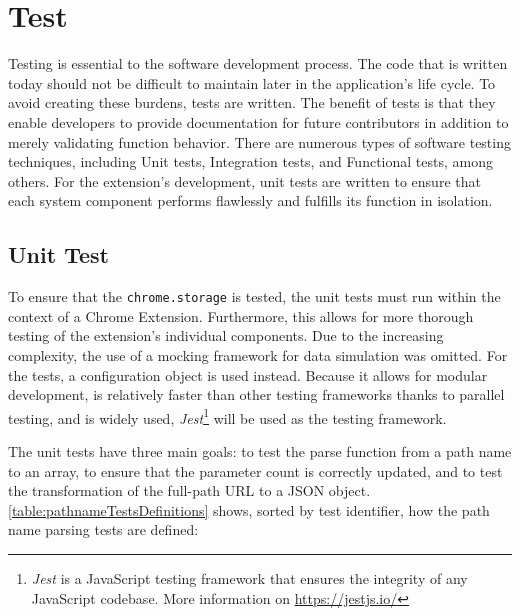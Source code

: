 \chapter{Test}
Testing is essential to the software development process. The code that is written today should not be difficult to maintain later in the application's life cycle. To avoid creating these burdens, tests are written. The benefit of tests is that they enable developers to provide documentation for future contributors in addition to merely validating function behavior. There are numerous types of software testing techniques, including Unit tests, Integration tests, and Functional tests, among others. For the extension's development, unit tests are written to ensure that each system component performs flawlessly and fulfills its function in isolation.

\section{Unit Test}
To ensure that the \texttt{chrome.storage} is tested, the unit tests must run within the context of a Chrome Extension. Furthermore, this allows for more thorough testing of the extension's individual components. Due to the increasing complexity, the use of a mocking framework for data simulation was omitted. For the tests, a configuration object is used instead. Because it allows for modular development, is relatively faster than other testing frameworks thanks to parallel testing, and is widely used, \emph{Jest}\footnote{\emph{Jest} is a JavaScript testing framework that ensures the integrity of any JavaScript codebase. More information on \url{https://jestjs.io/}} will be used as the testing framework.

The unit tests have three main goals: to test the parse function from a path name to an array, to ensure that the parameter count is correctly updated, and to test the transformation of the full-path URL to a JSON object. \autoref{table:pathnameTestsDefinitions} shows, sorted by test identifier, how the path name parsing tests are defined:

